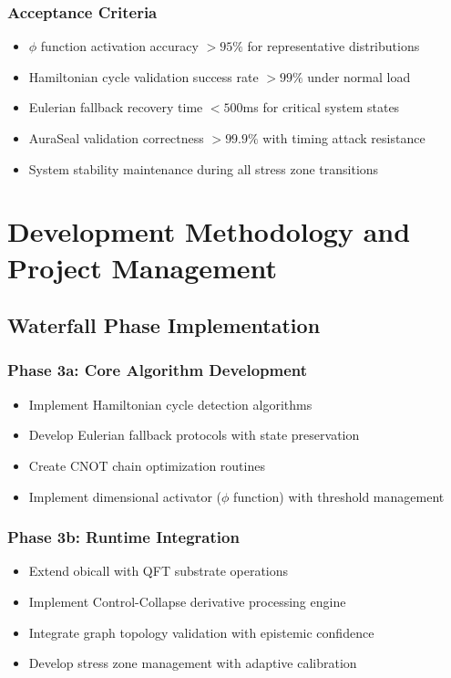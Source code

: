 \documentclass[12pt]{article}
\begin{document}
\subsubsection{Acceptance Criteria}

\begin{itemize}
    \item $\phi$ function activation accuracy $> 95\%$ for representative distributions
    \item Hamiltonian cycle validation success rate $> 99\%$ under normal load
    \item Eulerian fallback recovery time $< 500$ms for critical system states
    \item AuraSeal validation correctness $> 99.9\%$ with timing attack resistance
    \item System stability maintenance during all stress zone transitions
\end{itemize}

\section{Development Methodology and Project Management}

\subsection{Waterfall Phase Implementation}

\subsubsection{Phase 3a: Core Algorithm Development}
\begin{itemize}
    \item Implement Hamiltonian cycle detection algorithms
    \item Develop Eulerian fallback protocols with state preservation
    \item Create CNOT chain optimization routines
    \item Implement dimensional activator ($\phi$ function) with threshold management
\end{itemize}

\subsubsection{Phase 3b: Runtime Integration}
\begin{itemize}
    \item Extend obicall with QFT substrate operations
    \item Implement Control-Collapse derivative processing engine
    \item Integrate graph topology validation with epistemic confidence
    \item Develop stress zone management with adaptive calibration
\end{itemize}
\end{document}

